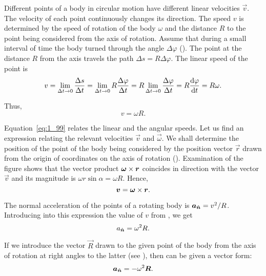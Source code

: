Different points of a body in circular motion have different linear velocities $\vec{v}$. The velocity of each point continuously changes its direction. The speed $v$ is determined by the speed of rotation of the body $\omega$ and the distance $R$ to the point being considered from the axis of rotation. Assume that during a small interval of time the body turned through the angle $\Delta\varphi$ (). The point at the distance $R$ from the axis travels the path $\Delta s=R\Delta\varphi$. The linear speed of the point is
\begin{equation*}
v = \lim_{\Delta t\to 0} \frac{\Delta s}{\Delta t} = \lim_{\Delta t\to 0} R\frac{\Delta\varphi}{\Delta t} = R \lim_{\Delta t\to 0} \frac{\Delta\varphi}{\Delta t} = R\frac{\mathrm{d}\varphi}{\mathrm{d} t} = R\omega.
\end{equation*}

\noindent
Thus,
\begin{equation}\label{eq:1_99}
v = \omega R.
\end{equation}

Equation~\eqref{eq:1_99} relates the linear and the angular speeds. Let us find an expression relating the relevant velocities $\vec{v}$ and $\vec{\omega}$. We shall determine the position of the point of the body being considered by the position vector $\vec{r}$ drawn from the origin of coordinates on the axis of rotation (). Examination of the figure shows that the vector product $\boldsymbol{\omega}\times\boldsymbol{r}$ coincides in direction with the vector $\vec{v}$ and its magnitude is $\omega r\sin\alpha=\omega R$. Hence,
\begin{equation}\label{eq:1_100}
\boldsymbol{v} = \boldsymbol{\omega}\times\boldsymbol{r}.
\end{equation}


The normal acceleration of the points of a rotating body is $\boldsymbol{a}_{\hat{\boldsymbol{n}}}=v^2/R$. Introducing into this expression the value of $v$ from , we get
\begin{equation}\label{eq:1_101}
a_{\hat{\boldsymbol{n}}} = \omega^2 R.
\end{equation}

\noindent
If we introduce the vector $\vec{R}$ drawn to the given point of the body from the axis of rotation at right angles to the latter (see ), then  can be given a vector form:
\begin{equation}\label{eq:1_102}
\boldsymbol{a}_{\hat{\boldsymbol{n}}} = -\omega^2 \boldsymbol{R}.
\end{equation}

